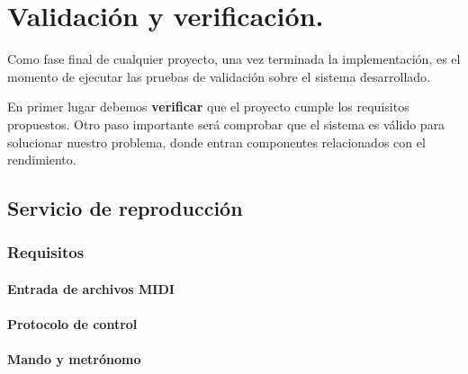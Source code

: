 \chapter{Validación y verificación.}
\label{cap:capitulo6}

Como fase final de cualquier proyecto, una vez terminada la implementación, es el momento de ejecutar las pruebas de validación sobre el sistema desarrollado.

En primer lugar debemos \textbf{verificar} que el proyecto cumple los requisitos propuestos. Otro paso importante será comprobar que el sistema es válido para solucionar nuestro problema, donde entran componentes relacionados con el rendimiento.

\section{Servicio de reproducción}

\subsection{Requisitos}

\subsubsection{Entrada de archivos MIDI}

\subsubsection{Protocolo de control}

\subsubsection{Mando y metrónomo}

\smallskip

